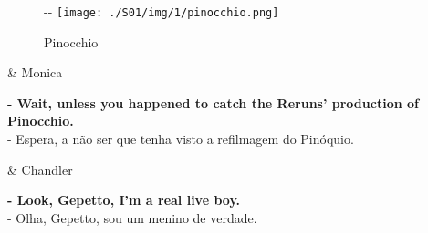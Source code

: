 \begin{figure}[!ht]
  \begin{adjustwidth}{-\oddsidemargin-1in}{-\rightmargin}
    \centering
    \texttt{[image: ./S01/img/1/pinocchio.png]}
    \caption{Pinocchio\label{fig:pinocchio}}
  \end{adjustwidth}
\end{figure}

\begin{tcolorbox}[enhanced,center upper,
    drop fuzzy shadow southeast, boxrule=0.3pt,
    lower separated=false,
    colframe=black!30!dialogoBorder,colback=white]
\begin{minipage}[c]{0.14\linewidth}
   & \centering \scriptsize{Monica}
\end{minipage}
\hspace{.1mm}
\begin{minipage}[c]{0.8\linewidth}
  \textbf{- Wait, unless you happened to catch the Reruns' production of Pinocchio.}\\
  - Espera, a não ser que tenha visto a refilmagem do Pinóquio.
\end{minipage}

\medskip
\begin{minipage}[c]{0.14\linewidth}
   & \centering \scriptsize{Chandler}
\end{minipage}
\hspace{.1mm}
\begin{minipage}[c]{0.8\linewidth}
  \textbf{- Look, Gepetto, I'm a real live boy.}\\
  - Olha, Gepetto, sou um menino de verdade.
\end{minipage}
\end{tcolorbox}

